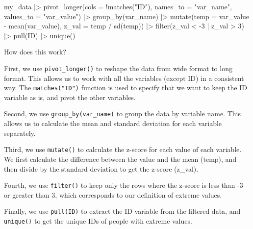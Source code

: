 \documentclass[
  letterpaper,
  8pt,
  a4paper]{book}
\newenvironment{Shaded}{\begin{snugshade}}{\end{snugshade}}
\newcommand{\AttributeTok}[1]{\textcolor[rgb]{0.40,0.45,0.13}{#1}}
\newcommand{\DecValTok}[1]{\textcolor[rgb]{0.68,0.00,0.00}{#1}}
\newcommand{\FunctionTok}[1]{\textcolor[rgb]{0.28,0.35,0.67}{#1}}
\newcommand{\NormalTok}[1]{\textcolor[rgb]{0.00,0.23,0.31}{#1}}
\newcommand{\SpecialCharTok}[1]{\textcolor[rgb]{0.37,0.37,0.37}{#1}}
\newcommand{\StringTok}[1]{\textcolor[rgb]{0.13,0.47,0.30}{#1}}
\begin{document}
\begin{Shaded}
\begin{Highlighting}[]
\NormalTok{my\_data }\SpecialCharTok{|\textgreater{}} 
  \FunctionTok{pivot\_longer}\NormalTok{(}\AttributeTok{cols =} \SpecialCharTok{!}\FunctionTok{matches}\NormalTok{(}\StringTok{"ID"}\NormalTok{),}
               \AttributeTok{names\_to =} \StringTok{"var\_name"}\NormalTok{,}
               \AttributeTok{values\_to =} \StringTok{"var\_value"}\NormalTok{) }\SpecialCharTok{|\textgreater{}} 
  \FunctionTok{group\_by}\NormalTok{(var\_name) }\SpecialCharTok{|\textgreater{}} 
  \FunctionTok{mutate}\NormalTok{(}\AttributeTok{temp =}\NormalTok{ var\_value }\SpecialCharTok{{-}} \FunctionTok{mean}\NormalTok{(var\_value),}
         \AttributeTok{z\_val =}\NormalTok{ temp }\SpecialCharTok{/} \FunctionTok{sd}\NormalTok{(temp)) }\SpecialCharTok{|\textgreater{}} 
  \FunctionTok{filter}\NormalTok{(z\_val }\SpecialCharTok{\textless{}} \SpecialCharTok{{-}}\DecValTok{3} \SpecialCharTok{|}\NormalTok{ z\_val }\SpecialCharTok{\textgreater{}} \DecValTok{3}\NormalTok{) }\SpecialCharTok{|\textgreater{}} 
  \FunctionTok{pull}\NormalTok{(ID) }\SpecialCharTok{|\textgreater{}} 
  \FunctionTok{unique}\NormalTok{()}
\end{Highlighting}
\end{Shaded}

How does this work?

First, we use \texttt{pivot\_longer()} to reshape the data from wide
format to long format. This allows us to work with all the variables
(except ID) in a consistent way. The \texttt{matches("ID")} function is
used to specify that we want to keep the ID variable as is, and pivot
the other variables.

Second, we use \texttt{group\_by(var\_name)} to group the data by
variable name. This allows us to calculate the mean and standard
deviation for each variable separately.

Third, we use \texttt{mutate()} to calculate the z-score for each value
of each variable. We first calculate the difference between the value
and the mean (temp), and then divide by the standard deviation to get
the z-score (z\_val).

Fourth, we use \texttt{filter()} to keep only the rows where the z-score
is less than -3 or greater than 3, which corresponds to our definition
of extreme values.

Finally, we use \texttt{pull(ID)} to extract the ID variable from the
filtered data, and \texttt{unique()} to get the unique IDs of people
with extreme values.
\end{document}
